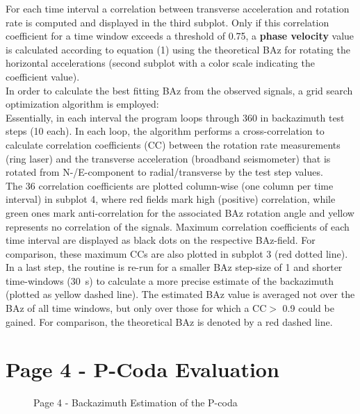\documentclass[a4paper,10pt]{article}
\begin{document}
For each time interval a correlation between transverse acceleration and rotation rate is computed and displayed in the third subplot. Only if this correlation coefficient for a time window exceeds a threshold of 0.75, a \textbf{phase velocity} value is calculated according to equation (1) using the theoretical BAz for rotating the horizontal accelerations (second subplot with a color scale indicating the coefficient value).\\
In order to calculate the best fitting BAz from the observed signals, a grid search optimization algorithm is employed:\\
Essentially, in each interval the program loops through 360\textdegree{} in backazimuth test steps (10\textdegree{} each). In each loop, the algorithm performs a cross-correlation to calculate correlation coefficients (CC) between the rotation rate measurements (ring laser) and the transverse acceleration (broadband seismometer) that is rotated from N-/E-component to radial/transverse by the test step values.\\
The 36 correlation coefficients are plotted column-wise (one column per time interval) in subplot 4, where red fields mark high (positive) correlation, while green ones mark anti-correlation for the associated BAz rotation angle and yellow represents no correlation of the signals. Maximum correlation coefficients of each time interval are displayed as black dots on the respective BAz-field. For comparison, these maximum CCs are also plotted in subplot 3 (red dotted line).\\
In a last step, the routine is re-run for a smaller BAz step-size of 1\textdegree{} and shorter time-windows (30~s) to calculate a more precise estimate of the backazimuth (plotted as yellow dashed line). The estimated BAz value is averaged not over the BAz of all time windows, but only over those for which a CC$>$ 0.9 could be gained.
For comparison, the theoretical BAz is denoted by a red dashed line. 

\section*{Page 4 - P-Coda Evaluation}

\begin{figure}[h!]
\centering
 \caption{Page 4 - Backazimuth Estimation of the P-coda}
 \label{page4}
\end{figure}
\end{document}

